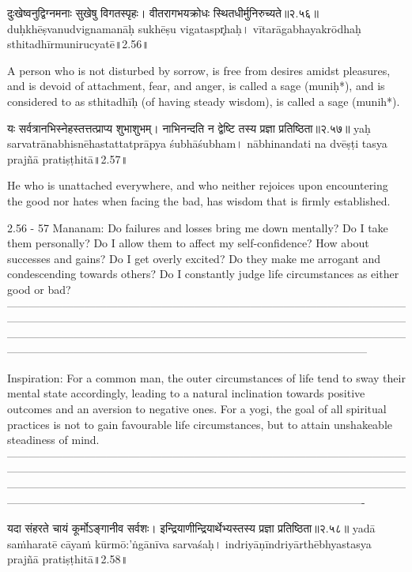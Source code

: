 दुःखेष्वनुद्विग्नमनाः सुखेषु विगतस्पृहः। 
वीतरागभयक्रोधः स्थितधीर्मुनिरुच्यते॥२.५६॥
duḥkhēṣvanudvignamanāḥ sukhēṣu vigataspr̥haḥ। 
vītarāgabhayakrōdhaḥ sthitadhīrmunirucyatē॥2.56॥

A person who is not disturbed by sorrow,  is free from desires amidst pleasures, and is devoid of attachment, fear, and anger, is called a sage (muniḥ*), and is considered to as sthitadhīḥ (of having steady wisdom), is called a sage (munih*).


यः सर्वत्रानभिस्नेहस्तत्तत्प्राप्य शुभाशुभम्। 
नाभिनन्दति न द्वेष्टि तस्य प्रज्ञा प्रतिष्ठिता॥२.५७॥
yaḥ sarvatrānabhisnēhastattatprāpya śubhāśubham। 
nābhinandati na dvēṣṭi tasya prajñā pratiṣṭhitā॥2.57॥

He who is unattached everywhere, and who neither rejoices upon encountering the good nor hates when facing the bad, has wisdom that is firmly established. 

2.56 - 57 Mananam: 
Do failures and losses bring me down mentally? Do I take them personally? Do I allow them to affect my self-confidence? How about successes and gains? Do I get overly excited? Do they make me arrogant and condescending towards others? Do I constantly judge life circumstances as either good or bad?
—-----------------------------------------------------------------------------------------------------------------------------------------------------------------------------------------------------------------------------------------------------------------------------------------------------------------------------------------------------------------------------------------------------------------------------------
 
Inspiration:
For a common man, the outer circumstances of life tend to sway their mental state accordingly, leading to a natural inclination towards positive outcomes and an aversion to negative ones.
For a yogi, the goal of all spiritual practices is not to gain favourable life circumstances, but to attain unshakeable steadiness of mind.
—----------------------------------------------------------------------------------------------------------------------------------------------------------------------------------------------------------------------------------------------------------------------------------------------------------------------------------------------------------------------------------------------------------------------------------



यदा संहरते चायं कूर्मोऽङ्गानीव सर्वशः। 
इन्द्रियाणीन्द्रियार्थेभ्यस्तस्य प्रज्ञा प्रतिष्ठिता॥२.५८॥
yadā saṁharatē cāyaṁ kūrmō:'ṅgānīva sarvaśaḥ। 
indriyāṇīndriyārthēbhyastasya prajñā pratiṣṭhitā॥2.58॥

